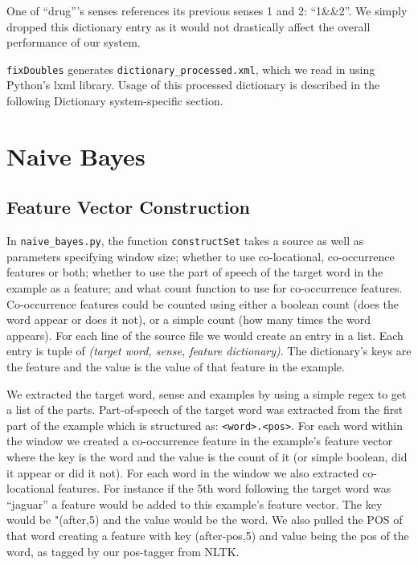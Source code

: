 \documentclass{article}
\begin{document}
One of ``drug'''s senses references its previous senses 1 and 2: ``1\&\&2''. We simply dropped this dictionary entry as it would not drastically affect the overall performance of our system.

\texttt{fixDoubles} generates \texttt{dictionary\_processed.xml}, which we read in using Python's lxml library. Usage of this processed dictionary is described in the following Dictionary system-specific section.

\section{Naive Bayes}

\subsection{Feature Vector Construction}
In \texttt{naive\_bayes.py}, the function \texttt{constructSet} takes a source as well as parameters specifying window size; whether to use co-locational, co-occurrence features or both; whether to use the part of speech of the target word in the example as a feature; and what count function to use for co-occurrence features. Co-occurrence features could be counted using either a boolean count (does the word appear or does it not), or a simple count (how many times the word appears). For each line of the source file we would create an entry in a list. Each entry is tuple of \emph{(target word, sense, feature dictionary)}. The dictionary's keys are the feature and the value is the value of that feature in the example. 

We extracted the target word, sense and examples by using a simple regex to get a list of the parts. Part-of-speech of the target word was extracted from the first part of the example which is structured as: \texttt{<word>.<pos>}. For each word within the window we created a co-occurrence feature in the example's feature vector where the key is the word and the value is the count of it (or simple boolean, did it appear or did it not). For each word in the window we also extracted co-locational features. For instance if the 5th word following the target word was ``jaguar'' a feature would be added to this example's feature vector. The key would be "(after,5) and the value would be the word. We also pulled the POS of that word creating a feature with key (after-pos,5) and value being the pos of the word, as tagged by our pos-tagger from NLTK.
\end{document}
